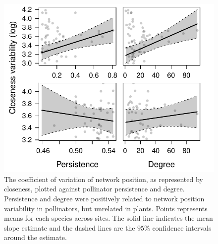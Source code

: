 \documentclass[12pt]{article}
\begin{document}
\begin{figure}
  \centering
  \includegraphics[width=.8\textwidth]{../analysis/variability/figures/cv/occ_degree.pdf}
  \caption{The coefficient of variation of network position, as
    represented by closeness, plotted against pollinator persistence
    and degree. Persistence and degree were positively related to
    network position variability in pollinators, but unrelated in
    plants. Points represents means for each species across sites.
    The solid line indicates the mean slope estimate and the dashed
    lines are the $95\%$ confidence intervals around the estimate. }
  \label{fig:cv}
\end{figure}
\clearpage
\end{document}
